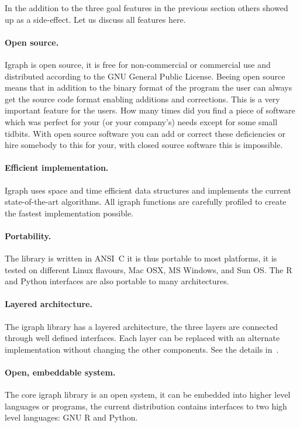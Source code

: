 \documentclass[twoside]{book}%
\begin{document}
In the addition to the three goal features in the previous section
others showed up as a side-effect. Let us discuss all features here.

\paragraph{Open source.} Igraph is open source, it is free for
non-commercial or commercial use and distributed according to the GNU
General Public License. Beeing open source means that in addition to
the binary format of the program the user can
always get the source code format enabling additions and corrections.
This is a very important feature for the users. How many times did you
find a piece of software which was perfect for your (or your
company's) needs except for some small tidbits. With open source
software you can add or correct these deficiencies or hire somebody to
this for your, with closed source software this is impossible.

\paragraph{Efficient implementation.} Igraph uses space and time
efficient data structures and implements the current state-of-the-art
algorithms. All igraph functions are carefully profiled to create the
fastest implementation possible.

\paragraph{Portability.} The library is written in ANSI~C it is thus
portable to most platforms, it is tested on different Linux flavours,
Mac OSX, MS Windows, and Sun OS. The R and Python interfaces are also
portable to many architectures.

\paragraph{Layered architecture.} The igraph library has a layered
architecture, the three layers are connected through well defined
interfaces. Each layer can be replaced with an alternate
implementation without changing the other components. See the details
in~.

\paragraph{Open, embeddable system.} The core igraph library is an
open system, it can be embedded into higher level languages or
programs, the current distribution contains interfaces to two high
level languages: GNU R and Python.
\end{document}
